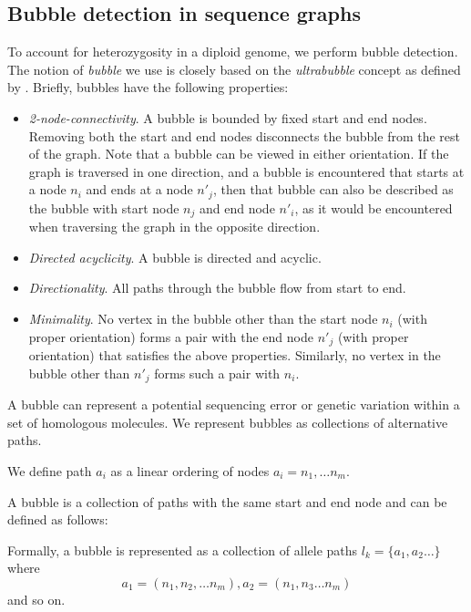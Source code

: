 \subsection{Bubble detection in sequence graphs} To account for heterozygosity in a diploid genome, we perform bubble detection. The notion of \textit{bubble} we use is closely based on the \textit{ultrabubble} concept as defined by \cite{paten2017superbubbles}. Briefly, bubbles have the following properties:
\begin{itemize}
 \item \textit{2-node-connectivity}. A bubble is bounded by fixed start and end nodes.
 Removing both the start and end nodes disconnects the bubble from the rest of the graph.
 Note that a bubble can be viewed in either orientation.
 If the graph is traversed in one direction, and a bubble is encountered that starts at a node $n_i$  and ends at a node $n'_j$, then that bubble can also be described as the bubble with start node $n_j$ and end node $n'_i$, as it would be encountered when traversing the graph in the opposite direction.
  \item \textit{Directed acyclicity}. A bubble is directed and acyclic.
 \item \textit{Directionality}. All paths through the bubble flow from start to end.
 \item \textit{Minimality}. No vertex in the bubble other than the start node $n_i$ (with proper orientation) forms a pair with the end node $n'_j$ (with proper orientation) that satisfies the above properties. Similarly, no vertex in the bubble other than $n'_j$ forms such a pair with $n_i$.
\end{itemize}

A bubble can represent a potential sequencing error or genetic variation within a set of homologous molecules.
We represent bubbles as collections of alternative paths.

\begin{definition}[Path] We define path $a_i$ as a linear ordering of nodes $a_i= n_1, \ldots n_m$. 
\label{def:allele-path}
\end{definition}

A bubble is a collection of paths with the same start and end node and can be defined as follows:
\begin{definition}[Bubble]
Formally, a bubble is represented as a collection of allele paths
 $l_k= \{a_1,a_2 \ldots\}$
 where 
 \[a_1=(n_1, n_2, \ldots n_m), a_2=(n_1, n_3 \ldots n_m)\] and so on. 
\end{definition}


